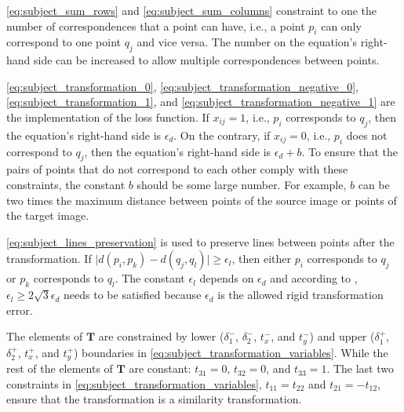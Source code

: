         \autoref{eq:subject_sum_rows} and \autoref{eq:subject_sum_columns} constraint to one the number of correspondences that a point can have,
        i.e., a point $p_i$ can only correspond to one point $q_j$ and vice versa. 
        The number on the equation’s right-hand side can be increased to allow multiple correspondences between points.

        \autoref{eq:subject_transformation_0}, \autoref{eq:subject_transformation_negative_0}, 
        \autoref{eq:subject_transformation_1}, and \autoref{eq:subject_transformation_negative_1} are the implementation of the loss function. 
        If $x_{ij} = 1$, i.e., $p_i$ corresponds to $q_j$, then the equation’s right-hand side is $\epsilon_d$. 
        On the contrary, if $x_{ij} = 0$, i.e., $p_i$ does not correspond to $q_j$, then the equation’s right-hand side is $\epsilon_d + b$.
        To ensure that the pairs of points that do not correspond to each other comply with these constraints, the constant $b$ should be some large number. 
        For example, $b$ can be two times the maximum distance between points of the source image or points of the target image. 

        \autoref{eq:subject_lines_preservation} is used to preserve lines between points after the transformation.
        If $\mid d(p_i, p_k) - d(q_j, q_l) \mid \geq \epsilon_l$, then either $p_i$ corresponds to $q_j$ or $p_k$ corresponds to $q_l$.
        The constant $\epsilon_l$ depends on $\epsilon_d$ and according to \cite{Sakakubara_2007_automatic}, 
        $\epsilon_l \geq 2 \sqrt{3} \epsilon_d$ needs to be satisfied because $\epsilon_d$ is the allowed rigid transformation error.

        The elements of $\pmb{T}$ are constrained by lower ($\delta_1^-$, $\delta_2^-$, $t_x^-$, and $t_y^-$)
        and upper ($\delta_1^+$, $\delta_2^+$, $t_x^+$, and $t_y^+$) boundaries in \autoref{eq:subject_transformation_variables}. 
        While the rest of the elements of $\pmb{T}$ are constant: $t_{31} = 0$, $t_{32} = 0$, and $t_{33} = 1$.
        The last two constraints in \autoref{eq:subject_transformation_variables}, $t_{11} = t_{22}$ and $t_{21} = -t_{12}$,
        ensure that the transformation is a similarity transformation.
          

